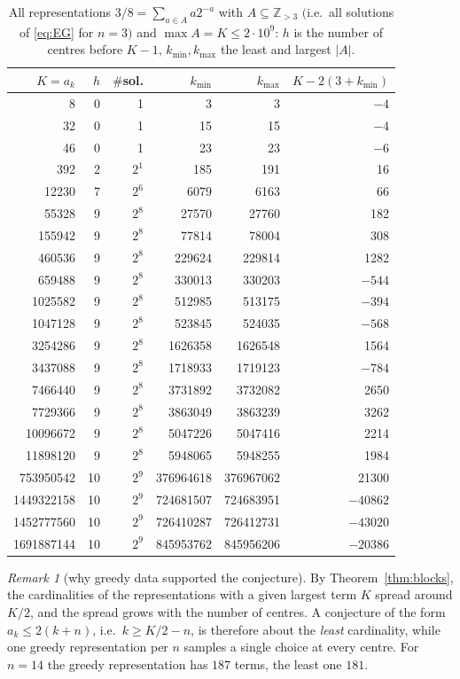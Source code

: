 \documentclass[11pt]{amsart}
\theoremstyle{definition}
\theoremstyle{remark}
\newtheorem{remark}[theorem]{Remark}
\newcommand{\Z}{\mathbb{Z}}
\begin{document}
\begin{table}[ht]
\centering\small
\begin{tabular}{r r r r r r}
\toprule
$K=a_k$ & $h$ & $\#$sol. & $k_{\min}$ & $k_{\max}$ & $K-2(3+k_{\min})$\\
\midrule
8 & 0 & 1 & 3 & 3 & $-4$\\
32 & 0 & 1 & 15 & 15 & $-4$\\
46 & 0 & 1 & 23 & 23 & $-6$\\
392 & 2 & $2^{1}$ & 185 & 191 & 16\\
12230 & 7 & $2^{6}$ & 6079 & 6163 & 66\\
55328 & 9 & $2^{8}$ & 27570 & 27760 & 182\\
155942 & 9 & $2^{8}$ & 77814 & 78004 & 308\\
460536 & 9 & $2^{8}$ & 229624 & 229814 & 1282\\
659488 & 9 & $2^{8}$ & 330013 & 330203 & $-544$\\
1025582 & 9 & $2^{8}$ & 512985 & 513175 & $-394$\\
1047128 & 9 & $2^{8}$ & 523845 & 524035 & $-568$\\
3254286 & 9 & $2^{8}$ & 1626358 & 1626548 & 1564\\
3437088 & 9 & $2^{8}$ & 1718933 & 1719123 & $-784$\\
7466440 & 9 & $2^{8}$ & 3731892 & 3732082 & 2650\\
7729366 & 9 & $2^{8}$ & 3863049 & 3863239 & 3262\\
10096672 & 9 & $2^{8}$ & 5047226 & 5047416 & 2214\\
11898120 & 9 & $2^{8}$ & 5948065 & 5948255 & 1984\\
753950542 & 10 & $2^{9}$ & 376964618 & 376967062 & 21300\\
1449322158 & 10 & $2^{9}$ & 724681507 & 724683951 & $-40862$\\
1452777560 & 10 & $2^{9}$ & 726410287 & 726412731 & $-43020$\\
1691887144 & 10 & $2^{9}$ & 845953762 & 845956206 & $-20386$\\
\bottomrule
\end{tabular}
\caption{All representations $3/8=\sum_{a\in A}a2^{-a}$ with $A\subseteq\Z_{>3}$ $($i.e.\ all solutions of \eqref{eq:EG} for $n=3)$ and $\max A=K\le 2\cdot 10^9$: $h$ is the number of centres before $K-1$, $k_{\min},k_{\max}$ the least and largest $|A|$.}\label{tab:n3}
\end{table}

\begin{remark}[why greedy data supported the conjecture]
By Theorem~\ref{thm:blocks}, the cardinalities of the representations with a given largest term $K$ spread around $K/2$, and the spread grows with the number of centres. A conjecture of the form $a_k\le2(k+n)$, i.e.\ $k\ge K/2-n$, is therefore about the \emph{least} cardinality, while one greedy representation per $n$ samples a single choice at every centre. For $n=14$ the greedy representation has $187$ terms, the least one $181$.
\end{remark}
\end{document}
